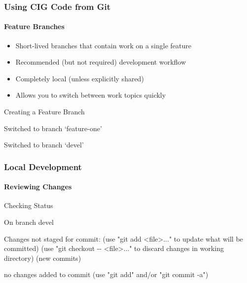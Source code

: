 \begin{frame}[fragile]
 \frametitle{Using CIG Code from Git}
 \framesubtitle{Feature Branches}

 \begin{itemize}
  \item Short-lived branches that contain work on a single feature
  \item Recommended (but not required) development workflow
  \item Completely local (unless explicitly shared)
  \item Allows you to switch between work topics quickly
 \end{itemize}

 \begin{exampleblock}{Creating a Feature Branch}
  \vspace{-1em}
  \begin{semiverbatim}
Switched to branch `feature-one'

Switched to branch `devel'
\end{semiverbatim}
 \end{exampleblock}
\end{frame}

\begin{frame}[fragile]
 \frametitle{Local Development}
 \framesubtitle{Reviewing Changes}

 \begin{exampleblock}{Checking Status}
  \vspace{-1em}
  \begin{semiverbatim}
On branch devel

Changes not staged for commit:
  (use "git add <file>..." to update what will be
   committed)
  (use "git checkout -{}- <file>..." to discard changes
   in working directory)
     (new commits)

no changes added to commit (use "git add" and/or "git
commit -a")
\end{semiverbatim}
 \end{exampleblock}
\end{frame}

